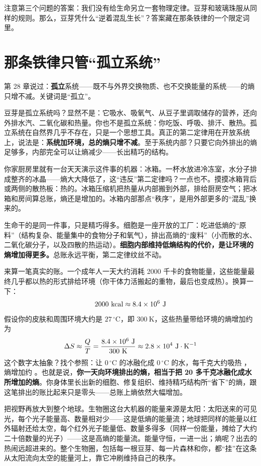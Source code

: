 注意第三个问题的答案：我们没有给生命另立一套物理定律。豆芽和玻璃珠服从同样的规则。那么，豆芽凭什么“逆着混乱生长”？答案藏在那条铁律的一个限定词里。

\section{那条铁律只管“孤立系统”}

第 28 章说过：\textbf{孤立}系统——既不与外界交换物质、也不交换能量的系统——的熵只增不减。关键词是“孤立”。

豆芽是孤立系统吗？显然不是：它吸水、吸氧气、从豆子里调取储存的营养，还向外排水汽、二氧化碳和热量。你也不是孤立系统：你吃饭、呼吸、排汗、散热。孤立系统在自然界几乎不存在，只是一个思想工具。真正的第二定律用在开放系统上，说法是：\textbf{系统加环境，总的熵只增不减}。至于系统内部？只要它向外排出的熵足够多，内部完全可以让熵减少——长出精巧的结构。

你家厨房里就有一台天天演示这件事的机器：冰箱。一杯水放进冷冻室，水分子排成整齐的冰晶——熵大大降低了，这“违反”第二定律吗？一点也不。摸摸冰箱背后或两侧的散热板：热的。冰箱压缩机把热量从内部搬到外部，排给厨房空气；把冰箱和房间算总账，熵还是增加的。冰箱内部那点“秩序”，是用外部更多的“混乱”换来的。

生命干的是同一件事，只是精巧得多。细胞是一座开放的工厂：吃进低熵的“原料”（结构复杂、能量集中的食物分子和氧气），排出高熵的“废料”（小而散的水、二氧化碳分子，以及四散的热运动）。\textbf{细胞内部维持低熵结构的代价，是让环境的熵增加得更多。}总账永远平衡，第二定律纹丝不动。

\begin{qiaoliang}
来算一笔真实的账。一个成年人一天大约消耗 2000 千卡的食物能量，这些能量最终几乎都以热的形式排给环境（你干体力活搬起的重物，最后也变成热）。换算一下：
\[2000\ \mathrm{kcal} \approx 8.4\times 10^{6}\ \mathrm{J}\]
假设你的皮肤和周围环境大约是 $27\,^{\circ}\mathrm{C}$，即 $300\ \mathrm{K}$，这些热量带给环境的熵增加约为
\[\Delta S \approx \frac{Q}{T} = \frac{8.4\times 10^{6}\ \mathrm{J}}{300\ \mathrm{K}} \approx 2.8\times 10^{4}\ \mathrm{J\cdot K^{-1}}\]
这个数字太抽象？找个参照：让 $0\,^{\circ}\mathrm{C}$ 的冰融化成 $0\,^{\circ}\mathrm{C}$ 的水，每千克大约吸热 ，熵增加约 。也就是说，\textbf{你一天向环境排出的熵，相当于把 20 多千克冰融化成水所增加的熵}。你身体里长出新的细胞、修复组织、维持精巧结构所“省下”的熵，跟这笔排出的账比起来只是零头——总账上熵依然大幅增加。
\end{qiaoliang}

把视野再放大到整个地球。生物圈这台大机器的能量来源是太阳：太阳送来的可见光，每个光子能量高、数量相对少——这是低熵的能量流；地球把同样的能量以红外辐射还给太空，每个红外光子能量低、数量多得多（同样一份能量，摊给了大约二十倍数量的光子）——这是高熵的能量流。能量守恒，一进一出；熵呢？出去的热闹远超进来的。整个生物圈，包括每一根豆芽、每一片森林和你，都“挂”在这条从太阳流向太空的能量河上，靠它冲刷维持自己的秩序。

